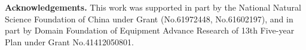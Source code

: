 \documentclass[letterpaper]{article} \usepackage{aaai21}  \usepackage{times}  \usepackage{helvet} \usepackage{courier}  \usepackage[hyphens]{url}  \usepackage{graphicx} \urlstyle{rm} \def\UrlFont{\rm}  \usepackage{graphicx}  \usepackage{natbib}  \usepackage{caption} \frenchspacing  \setlength{\pdfpagewidth}{8.5in}  \setlength{\pdfpageheight}{11in}  \usepackage{amsmath}
\begin{document}
\clearpage
\noindent \textbf{Acknowledgements.} This work was supported in part by the National Natural Science Foundation of China under Grant (No.61972448, No.61602197), and in part by Domain Foundation of Equipment Advance Research of 13th Five-year Plan under Grant No.41412050801.


\end{document}
